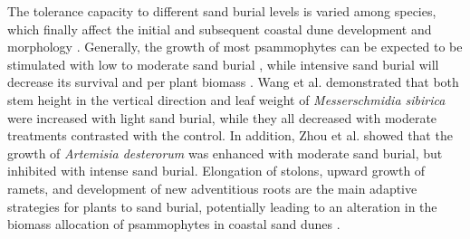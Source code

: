 \documentclass[]{interact}
\theoremstyle{plain}%
\theoremstyle{definition}
\theoremstyle{remark}
\begin{document}
\label{Introduction-3}
The tolerance capacity to different sand burial levels is varied among species, which finally affect the initial and subsequent coastal dune development and morphology 
\citep{hespReviewBiologicalGeomorphological1989}. 
Generally, the growth of most psammophytes can be expected to be stimulated with low to moderate sand burial \citep{zhouAnalysisgrowthstrategy2015,harrisDifferentialResponseBarrier2017,brownMechanismsSurvivingBurial2018,wangEffectsSandBurial2019}, while intensive sand burial will decrease its survival and per plant biomass \citep{maunEffectsBurialSand1996,franksBurialDisturbanceLeads2003}. Wang et al. \citet{wangAdvancesStudiesMorphological2005} demonstrated that both stem height in the vertical direction and leaf weight of \textit{Messerschmidia sibirica} were increased with light sand burial, while they all decreased with moderate treatments contrasted with the control. In addition, Zhou et al. \citet{zhouphysiologicaladaptationmechanisms2015} showed that the growth of \textit{Artemisia desterorum} was enhanced with moderate sand burial, but inhibited with intense sand burial. Elongation of stolons, upward growth of ramets, and development of new adventitious roots are the main adaptive strategies for plants to sand burial, potentially leading to an alteration in the biomass allocation of psammophytes in coastal sand dunes \citep{dechAdventitiousRootProduction2006,frosiniGlobalChangeResponse2012,mendoza-gonzalezBiologicalFloraCoastal2014,brownMechanismsSurvivingBurial2018}.
\end{document}

